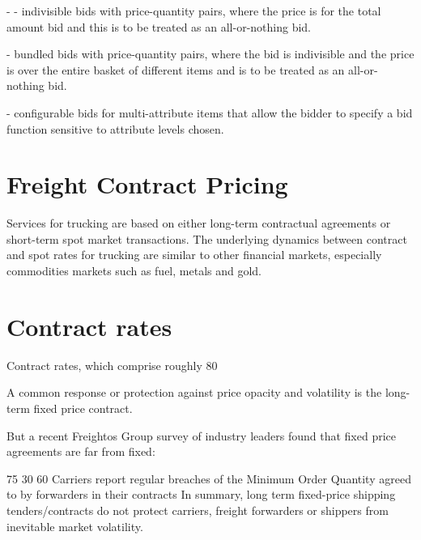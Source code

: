 \documentclass{article}
\begin{document}
- - indivisible bids with price-quantity pairs, where the price is for the total
amount bid and this is to be treated as an all-or-nothing bid.

- bundled bids with price-quantity pairs, where the bid is indivisible and
the price is over the entire basket of different items and is to be treated
as an all-or-nothing bid.

- configurable bids for multi-attribute items that allow the bidder to specify
a bid function sensitive to attribute levels chosen.


\section{Freight Contract Pricing}

Services for trucking are based on either long-term contractual agreements or short-term spot market transactions. The underlying dynamics between contract and spot rates for trucking are similar to other financial markets, especially commodities markets such as fuel, metals and gold.  

\section{Contract rates}
Contract rates, which comprise roughly 80%

A common response or protection against price opacity and volatility is the long-term fixed price contract. 

But a recent Freightos Group survey of industry leaders found that fixed price agreements are far from fixed:

75%
30%
60%
Carriers report regular breaches of the Minimum Order Quantity agreed to by forwarders in their contracts
In summary, long term fixed-price shipping tenders/contracts do not protect carriers, freight forwarders or shippers from inevitable market volatility. 
\end{document}
